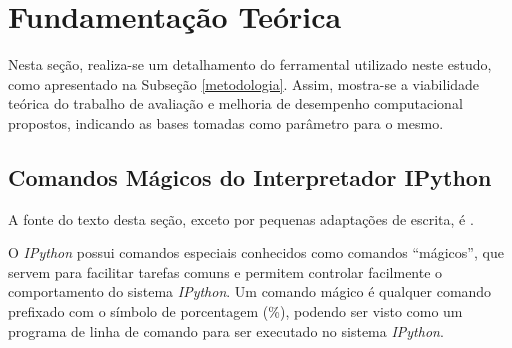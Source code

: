 \documentclass[12pt]{article}
\newcommand{\aspas}[1]{``#1''} %
\begin{document}

\section{Fundamentação Teórica}
\label{fundamentacao}

Nesta seção, realiza-se um detalhamento do ferramental utilizado neste estudo, como apresentado na Subseção \ref{metodologia}. Assim, mostra-se a viabilidade teórica do trabalho de avaliação e melhoria de desempenho computacional propostos, indicando as bases tomadas como parâmetro para o mesmo.

\subsection{Comandos Mágicos do Interpretador IPython}

A fonte do texto desta seção, exceto por pequenas adaptações de escrita, é \cite{mckinney:2018}.

%

O \textit{IPython} possui comandos especiais conhecidos como comandos \aspas{mágicos}, que servem para facilitar tarefas comuns e permitem controlar facilmente o comportamento do sistema \textit{IPython}. Um comando mágico é qualquer comando prefixado com o símbolo de porcentagem (\%), podendo ser visto como um programa de linha de comando para ser executado no sistema \textit{IPython}.
\end{document}
